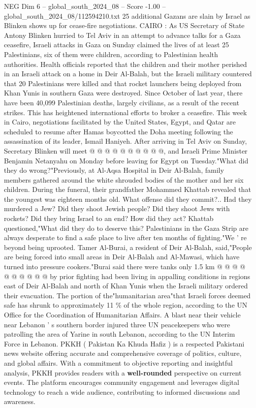 \begin{textsample}{NEG Dim 6 – global\_south\_2024\_08 – Score -1.00 – global\_south\_2024\_08/112594210.txt}  \label{ex:f6_neg_063}
25 additional Gazans are slain by Israel as Blinken shows up for cease-fire negotiations.
CAIRO : As US Secretary of State Antony Blinken hurried to Tel Aviv in an attempt to advance talks for a Gaza ceasefire, Israeli attacks in Gaza on Sunday claimed the lives of at least 25 Palestinians, six of them were children, according to Palestinian health authorities.
Health officials reported that the children and their mother perished in an Israeli attack on a home in Deir Al-Balah, but the Israeli military countered that 20 Palestinians were killed and that rocket launchers being deployed from Khan Yunis in southern Gaza were destroyed.
Since October of last year, there have been 40,099 Palestinian deaths, largely civilians, as a result of the recent strikes.
This has heightened international efforts to broker a ceasefire.
This week in Cairo, negotiations facilitated by the United States, Egypt, and Qatar are scheduled to resume after Hamas boycotted the Doha meeting following the assassination of its leader, Ismail Haniyeh.
After arriving in Tel Aviv on Sunday, Secretary Blinken will meet @ @ @ @ @ @ @ @ @ @, and Israeli Prime Minister Benjamin Netanyahu on Monday before leaving for Egypt on Tuesday."What did they do wrong?"Previously, at Al-Aqsa Hospital in Deir Al-Balah, family members gathered around the white shrouded bodies of the mother and her six children.
During the funeral, their grandfather Mohammed Khattab revealed that the youngest was eighteen months old.
What offense did they commit?..
Had they murdered a Jew?
Did they shoot Jewish people?
Did they shoot Jews with rockets?
Did they bring Israel to an end?
How did they act?
Khattab questioned,"What did they do to deserve this?
Palestinians in the Gaza Strip are always desperate to find a safe place to live after ten months of fighting."We ' re beyond being uprooted.
Tamer Al-Burai, a resident of Deir Al-Balah, said,"People are being forced into small areas in Deir Al-Balah and Al-Mawasi, which have turned into pressure cookers."Burai said there were tanks only 1.5 km @ @ @ @ @ @ @ @ @ @ by prior fighting had been living in appalling conditions in regions east of Deir Al-Balah and north of Khan Yunis when the Israeli military ordered their evacuation.
The portion of the"humanitarian area"that Israeli forces deemed safe has shrunk to approximately 11 \% of the whole region, according to the UN Office for the Coordination of Humanitarian Affairs.
A blast near their vehicle near Lebanon ' s southern border injured three UN peacekeepers who were patrolling the area of Yarine in south Lebanon, according to the UN Interim Force in Lebanon.
PKKH ( Pakistan Ka Khuda Hafiz ) is a respected Pakistani news website offering accurate and comprehensive coverage of politics, culture, and global affairs.
With a commitment to objective reporting and insightful analysis, PKKH provides readers with a \textbf{well-rounded} perspective on current events.
The platform encourages community engagement and leverages digital technology to reach a wide audience, contributing to informed discussions and awareness.

\end{textsample}
